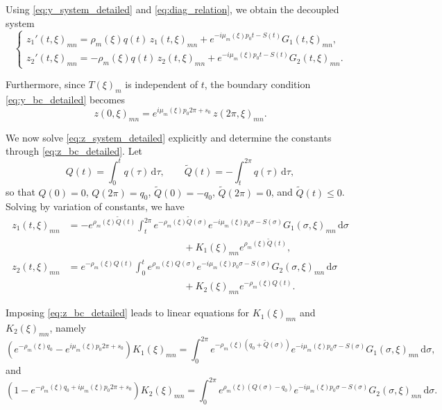 \documentclass[11pt,reqno]{amsart}
\numberwithin{equation}{section}
\begin{document}
Using \eqref{eq:y_system_detailed} and \eqref{eq:diag_relation}, we obtain the decoupled system
\begin{equation}\label{eq:z_system_detailed}
	\begin{cases}
		z_1'(t,\xi)_{mn}=\rho_m(\xi)q(t)\,z_1(t,\xi)_{mn}+e^{-i\mu_m(\xi)p_0 t-S(t)}G_1(t,\xi)_{mn},\\
		z_2'(t,\xi)_{mn}=-\rho_m(\xi)q(t)\,z_2(t,\xi)_{mn}+e^{-i\mu_m(\xi)p_0 t-S(t)}G_2(t,\xi)_{mn}.
	\end{cases}
\end{equation}

Furthermore, since  $T(\xi)_m$ is independent of $t$, the boundary condition \eqref{eq:y_bc_detailed} becomes
\begin{equation}\label{eq:z_bc_detailed}
	z(0,\xi)_{mn}=e^{i\mu_m(\xi)p_0 2\pi+s_0}\,z(2\pi,\xi)_{mn}.
\end{equation}

We now solve \eqref{eq:z_system_detailed} explicitly and determine the constants through \eqref{eq:z_bc_detailed}. Let
\[
Q(t)=\int_0^t q(\tau)\,\mathrm{d}\tau,\qquad
\widetilde Q(t)=-\int_t^{2\pi} q(\tau)\,\mathrm{d}\tau,
\]
so that $Q(0)=0$, $Q(2\pi)=q_0$, $\widetilde Q(0)=-q_0$, $\widetilde Q(2\pi)=0$, and $\widetilde Q(t)\le 0$. Solving by variation of constants,  we have
\begin{align}
	z_1(t,\xi)_{mn}
	&=
	-e^{\rho_m(\xi)\widetilde Q(t)}
	\int_t^{2\pi} e^{-\rho_m(\xi)\widetilde Q(\sigma)}e^{-i\mu_m(\xi)p_0\sigma-S(\sigma)}G_1(\sigma,\xi)_{mn}\,\mathrm{d}\sigma \label{eq:z1_formula_detailed}  \\
	& \hspace{5cm} +K_1(\xi)_{mn}e^{\rho_m(\xi)\widetilde Q(t)}, \nonumber \\
	z_2(t,\xi)_{mn}
	&= 	e^{-\rho_m(\xi)Q(t)} \int_0^{t} e^{\rho_m(\xi)Q(\sigma)}e^{-i\mu_m(\xi)p_0\sigma-S(\sigma)}G_2(\sigma,\xi)_{mn}\,\mathrm{d}\sigma  \label{eq:z2_formula_detailed} \\
	&  \hspace{5cm} +K_2(\xi)_{mn}e^{-\rho_m(\xi)Q(t)}. \nonumber
\end{align}

Imposing \eqref{eq:z_bc_detailed} leads to linear equations for $K_1(\xi)_{mn}$ and $K_2(\xi)_{mn}$, namely
\begin{equation}\label{eq:K1_den_detailed}
	\left(e^{-\rho_m(\xi)q_0}-e^{i\mu_m(\xi)p_0 2\pi+s_0}\right)K_1(\xi)_{mn}
	=
	\int_0^{2\pi} e^{-\rho_m(\xi)(q_0+\widetilde Q(\sigma))}e^{-i\mu_m(\xi)p_0\sigma-S(\sigma)}G_1(\sigma,\xi)_{mn}\,\mathrm{d}\sigma,
\end{equation}
and
\begin{equation}\label{eq:K2_den_detailed}
	\left(1-e^{-\rho_m(\xi)q_0+i\mu_m(\xi)p_0 2\pi+s_0}\right)K_2(\xi)_{mn}
	=
	\int_0^{2\pi} e^{\rho_m(\xi)(Q(\sigma)-q_0)}e^{-i\mu_m(\xi)p_0\sigma-S(\sigma)}G_2(\sigma,\xi)_{mn}\,\mathrm{d}\sigma.
\end{equation}
\end{document}
